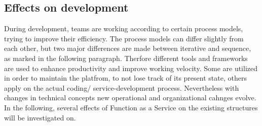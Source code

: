 \documentclass[a4paper,twoside,11pt, pagesize]{scrartcl}
\begin{document}
\begin{spacing}{1.2}
\subsection{Effects on development}During development, teams are working according to certain process models, trying to improve their efficiency. The process models can differ slightly from each other, but two major differences are made between iterative and sequence, as marked in the following paragraph. Therfore different tools and frameworks are used to enhance productivity and improve working velocity. Some are utilized in order to maintain the platfrom, to not lose track of its present state, others apply on the actual coding/ service-development process. Nevertheless with changes in technical concepts new operational and organizational cahnges evolve. In the following, several effects of Function as a Service on the existing structures will be investigated on. %

\end{spacing}
\end{document}
